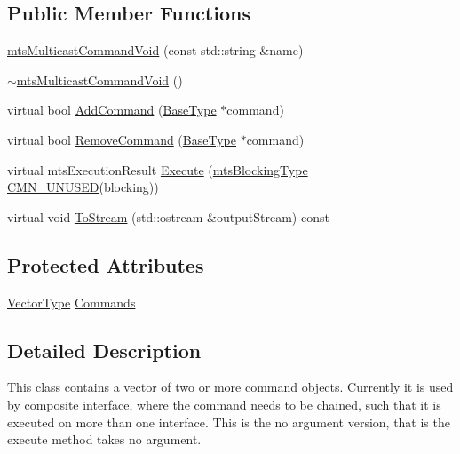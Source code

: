 \subsection*{Public Member Functions}
\begin{DoxyCompactItemize}
\item 
\hyperlink{classmts_multicast_command_void_a0cab0a922e91a5e620e70162f7d3fe65}{mts\+Multicast\+Command\+Void} (const std\+::string \&name)
\item 
\hyperlink{classmts_multicast_command_void_ad96e12608775cabdd603604353cff4a7}{$\sim$mts\+Multicast\+Command\+Void} ()
\item 
virtual bool \hyperlink{classmts_multicast_command_void_a2d04e7d3c12a6a47535540d34c737576}{Add\+Command} (\hyperlink{classmts_command_void_aa0e2be86c520aef7b9c3a59e3cfbbce3}{Base\+Type} $\ast$command)
\item 
virtual bool \hyperlink{classmts_multicast_command_void_a7b9664767999861a6bc08fda5e405e94}{Remove\+Command} (\hyperlink{classmts_command_void_aa0e2be86c520aef7b9c3a59e3cfbbce3}{Base\+Type} $\ast$command)
\item 
virtual mts\+Execution\+Result \hyperlink{classmts_multicast_command_void_a8e00a2156c2aafd723a554e979974b60}{Execute} (\hyperlink{mts_forward_declarations_8h_ad7426ccb6c883bc780d0ee197dddcbe7}{mts\+Blocking\+Type} \hyperlink{cmn_portability_8h_a021894e2626935fa2305434b1e893ff6}{C\+M\+N\+\_\+\+U\+N\+U\+S\+E\+D}(blocking))
\item 
virtual void \hyperlink{classmts_multicast_command_void_a8d3442e9f633665c9e465c351432c82e}{To\+Stream} (std\+::ostream \&output\+Stream) const 
\end{DoxyCompactItemize}
\subsection*{Protected Attributes}
\begin{DoxyCompactItemize}
\item 
\hyperlink{classmts_multicast_command_void_a2d0478105f8fcc377056363ab5aa7fa0}{Vector\+Type} \hyperlink{classmts_multicast_command_void_a71303972432c845838760333033f6226}{Commands}
\end{DoxyCompactItemize}


\subsection{Detailed Description}
This class contains a vector of two or more command objects. Currently it is used by composite interface, where the command needs to be chained, such that it is executed on more than one interface. This is the no argument version, that is the execute method takes no argument. 

